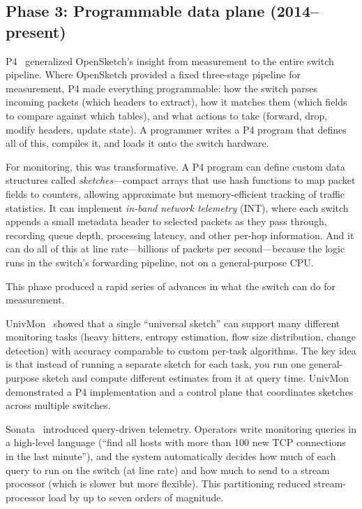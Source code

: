 \documentclass[letterpaper,twocolumn,10pt]{article}
\begin{document}
\subsection{Phase 3: Programmable data plane (2014--present)}

P4~\cite{bosshart2014p4} generalized OpenSketch's insight from
measurement to the entire switch pipeline. Where OpenSketch
provided a fixed three-stage pipeline for measurement, P4 made
everything programmable: how the switch parses incoming packets
(which headers to extract), how it matches them (which fields to
compare against which tables), and what actions to take (forward,
drop, modify headers, update state). A programmer writes a P4
program that defines all of this, compiles it, and loads it onto
the switch hardware.

For monitoring, this was transformative. A P4 program can define
custom data structures called \emph{sketches}---compact arrays
that use hash functions to map packet fields to counters, allowing
approximate but memory-efficient tracking of traffic statistics.
It can implement \emph{in-band network telemetry} (INT), where
each switch appends a small metadata header to selected packets
as they pass through, recording queue depth, processing latency,
and other per-hop information. And it can do all of this at line
rate---billions of packets per second---because the logic runs in
the switch's forwarding pipeline, not on a general-purpose CPU.

This phase produced a rapid series of advances in what the switch
can do for measurement.

UnivMon~\cite{liu2016univmon} showed that a single ``universal
sketch'' can support many different monitoring tasks (heavy
hitters, entropy estimation, flow size distribution, change
detection) with accuracy comparable to custom per-task algorithms.
The key idea is that instead of running a separate sketch for
each task, you run one general-purpose sketch and compute
different estimates from it at query time. UnivMon demonstrated a
P4 implementation and a control plane that coordinates sketches
across multiple switches.

Sonata~\cite{gupta2018sonata} introduced query-driven telemetry.
Operators write monitoring queries in a high-level language (``find
all hosts with more than 100 new TCP connections in the last
minute''), and the system automatically decides how much of each
query to run on the switch (at line rate) and how much to send
to a stream processor (which is slower but more flexible). This
partitioning reduced stream-processor load by up to seven orders
of magnitude.
\end{document}
